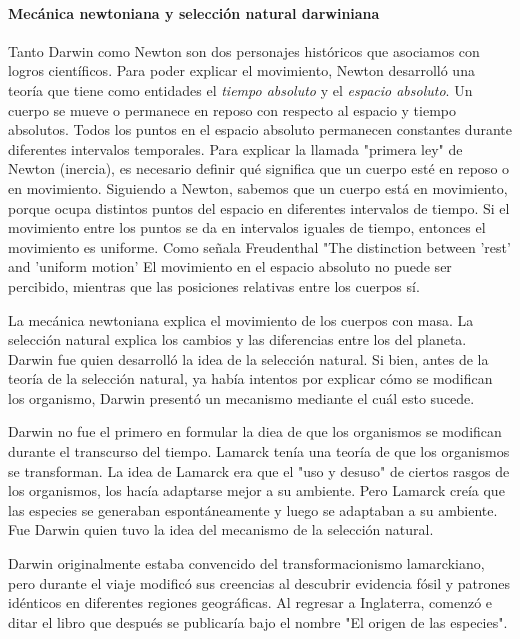 {{{{\paragraph{Mecánica newtoniana y selección natural darwiniana}

Tanto Darwin como Newton son dos personajes históricos que asociamos con logros científicos.
Para poder explicar el movimiento, Newton desarrolló una teoría que tiene como entidades el \emph{tiempo absoluto} y el \emph{espacio absoluto}.
Un cuerpo se mueve o permanece en reposo con respecto al espacio y tiempo absolutos.
Todos los puntos en el espacio absoluto permanecen constantes durante diferentes intervalos temporales.
Para explicar la llamada "primera ley" de Newton (inercia), es necesario definir qué significa que un cuerpo esté en reposo o en movimiento.
Siguiendo a Newton, sabemos que un cuerpo está en movimiento, porque ocupa distintos puntos del espacio en diferentes intervalos de tiempo.
Si el movimiento entre los puntos se da en intervalos iguales de tiempo, entonces el movimiento es uniforme.
Como señala Freudenthal "The distinction between 'rest' and 'uniform motion' %
El movimiento en el espacio absoluto no puede ser percibido, mientras que las posiciones relativas entre los cuerpos sí.

La mecánica newtoniana explica el movimiento de los cuerpos con masa.
La selección natural explica los cambios y las diferencias entre los del planeta.
Darwin fue quien desarrolló la idea de la selección natural.
Si bien, antes de la teoría de la selección natural, ya había intentos por explicar cómo se modifican los organismo, Darwin presentó un mecanismo mediante el cuál esto sucede.

Darwin no fue el primero en formular la diea de que los organismos se modifican durante el transcurso del tiempo.
Lamarck tenía una teoría de que los organismos se transforman.
La idea de Lamarck era que el "uso y desuso" de ciertos rasgos de los organismos, los hacía adaptarse mejor a su ambiente.
Pero Lamarck creía que las especies se generaban espontáneamente y luego se adaptaban a su ambiente.
Fue Darwin quien tuvo la idea del mecanismo de la selección natural.

Darwin originalmente estaba convencido del transformacionismo lamarckiano, pero durante el viaje modificó sus creencias al descubrir evidencia fósil y patrones idénticos en diferentes regiones geográficas.
Al regresar a Inglaterra, comenzó e ditar el libro que después se publicaría bajo el nombre "El origen de las especies".

}}}}
